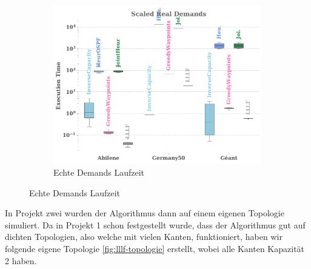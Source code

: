 \begin{figure}
\begin{subfigure}{0.45\textwidth}
        \end{subfigure}
        \begin{subfigure}{0.45\textwidth}
            \centering
            \caption{Echte Demands Laufzeit}
            \label{fig:ergebnisse_lllf_projekt1_4}
            \includegraphics[width=\textwidth]{Report/bilder/algorithmus1/projekt1/real_demands_execution_time.pdf}
        \end{subfigure}
    \end{figure}

    In Projekt zwei wurden der Algorithmus dann auf einem eigenen Topologie simuliert. Da in Projekt 1 schon festgestellt wurde, dass der Algorithmus gut auf dichten Topologien, also welche mit vielen Kanten, funktioniert, haben wir folgende eigene Topologie \ref{fig:lllf-topologie} erstellt, wobei alle Kanten Kapazität 2 haben.

